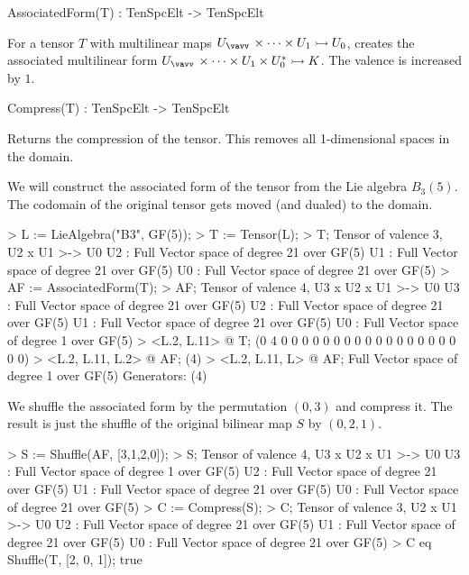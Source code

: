 \begin{intrinsics}
AssociatedForm(T) : TenSpcElt -> TenSpcElt
\end{intrinsics}

For a tensor $T$ with multilinear maps $U_{\vav}\times \cdots \times U_1\rightarrowtail U_0$,
creates the associated multilinear form
$U_{\vav}\times\cdots\times U_1\times U_0^*\rightarrowtail K$. 
The valence is increased by $1$.

\begin{intrinsics}
Compress(T) : TenSpcElt -> TenSpcElt
\end{intrinsics}

Returns the compression of the tensor. This removes all 1-dimensional spaces in the domain.

\begin{example}[CompressAssocForm]

We will construct the associated form of the tensor from the Lie algebra $B_3(5)$. 
The codomain of the original tensor gets moved (and dualed) to the domain. 
\begin{code}
> L := LieAlgebra("B3", GF(5));
> T := Tensor(L); 
> T;
Tensor of valence 3, U2 x U1 >-> U0
U2 : Full Vector space of degree 21 over GF(5)
U1 : Full Vector space of degree 21 over GF(5)
U0 : Full Vector space of degree 21 over GF(5)
> AF := AssociatedForm(T);
> AF;
Tensor of valence 4, U3 x U2 x U1 >-> U0
U3 : Full Vector space of degree 21 over GF(5)
U2 : Full Vector space of degree 21 over GF(5)
U1 : Full Vector space of degree 21 over GF(5)
U0 : Full Vector space of degree 1 over GF(5)
> <L.2, L.11> @ T;
(0 4 0 0 0 0 0 0 0 0 0 0 0 0 0 0 0 0 0 0 0)
> <L.2, L.11, L.2> @ AF;
(4)
> <L.2, L.11, L> @ AF;
Full Vector space of degree 1 over GF(5)
Generators:
(4)
\end{code}

We shuffle the associated form by the permutation $(0,3)$ and compress it.
The result is just the shuffle of the original bilinear map $S$ by $(0,2,1)$.

\begin{code}
> S := Shuffle(AF, [3,1,2,0]);
> S;
Tensor of valence 4, U3 x U2 x U1 >-> U0
U3 : Full Vector space of degree 1 over GF(5)
U2 : Full Vector space of degree 21 over GF(5)
U1 : Full Vector space of degree 21 over GF(5)
U0 : Full Vector space of degree 21 over GF(5)
> C := Compress(S);
> C;
Tensor of valence 3, U2 x U1 >-> U0
U2 : Full Vector space of degree 21 over GF(5)
U1 : Full Vector space of degree 21 over GF(5)
U0 : Full Vector space of degree 21 over GF(5)
> C eq Shuffle(T, [2, 0, 1]);
true
\end{code}
\end{example}

